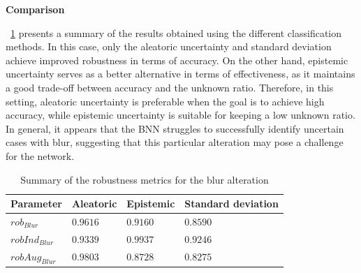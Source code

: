 \vspace{0.3cm}
\textbf{Comparison}
\vspace{0.1cm}

\Tab~\ref{table:rob_bl} presents a summary of the results obtained using the different classification methods. In this case, only the aleatoric uncertainty and standard deviation achieve improved robustness in terms of accuracy. On the other hand, epistemic uncertainty serves as a better alternative in terms of effectiveness, as it maintains a good trade-off between accuracy and the unknown ratio. Therefore, in this setting, aleatoric uncertainty is preferable when the goal is to achieve high accuracy, while epistemic uncertainty is suitable for keeping a low unknown ratio. In general, it appears that the BNN struggles to successfully identify uncertain cases with blur, suggesting that this particular alteration may pose a challenge for the network.

\begin{table}[h]
	\centering
	\begin{tabular}{|| l | l | l | l ||} 
		\hline
		\textbf{Parameter} & \textbf{Aleatoric} & \textbf{Epistemic} & \textbf{Standard deviation} \\
		\hline
		\hline
		$rob_{Blur}$ & $0.9616$ & $0.9160$ & $0.8590$ \\
		$robInd_{Blur}$ & $0.9339$ & $0.9937$ & $0.9246$ \\
		$robAug_{Blur}$ & $0.9803$ & $0.8728$ & $0.8275$ \\	
		\hline
	\end{tabular}	
	\caption{Summary of the robustness metrics for the blur alteration}
	\label{table:rob_bl}
\end{table}